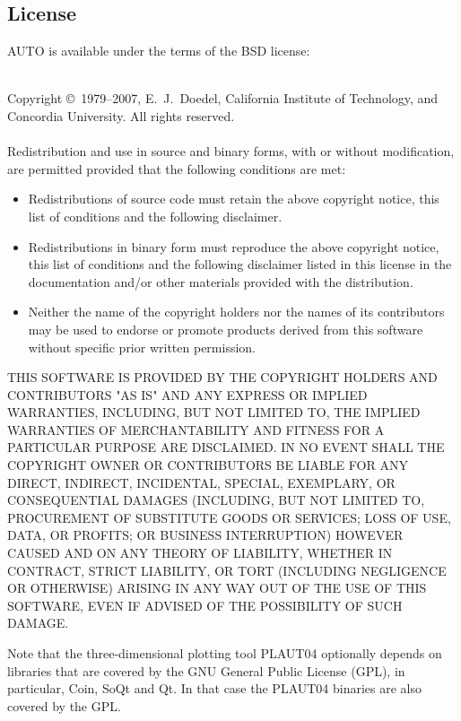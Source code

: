 \documentclass[12pt]{report}
\begin{document}
\subsection*{License}
{\cal AUTO} is available under the terms of the BSD license:\\
\begin{footnotesize}
~\\
Copyright \copyright~1979--2007, E.~J.~Doedel, California Institute of
Technology, and Concordia University.  All rights reserved.\\
~\\
Redistribution and use in source and binary forms, with or without
modification, are permitted provided that the following conditions are
met:
\begin{itemize}
\item Redistributions of source code must retain the above copyright
  notice, this list of conditions and the following disclaimer. 
  
\item Redistributions in binary form must reproduce the above copyright
  notice, this list of conditions and the following disclaimer listed
  in this license in the documentation and/or other materials
  provided with the distribution.
  
\item Neither the name of the copyright holders nor the names of its
  contributors may be used to endorse or promote products derived from
  this software without specific prior written permission.
\end{itemize}
THIS SOFTWARE IS PROVIDED BY THE COPYRIGHT HOLDERS AND CONTRIBUTORS
"AS IS" AND ANY EXPRESS OR IMPLIED WARRANTIES, INCLUDING, BUT NOT  
LIMITED TO, THE IMPLIED WARRANTIES OF MERCHANTABILITY AND FITNESS FOR
A PARTICULAR PURPOSE ARE DISCLAIMED. IN NO EVENT SHALL THE COPYRIGHT 
OWNER OR CONTRIBUTORS BE LIABLE FOR ANY DIRECT, INDIRECT, INCIDENTAL,
SPECIAL, EXEMPLARY, OR CONSEQUENTIAL DAMAGES (INCLUDING, BUT NOT
LIMITED TO, PROCUREMENT OF SUBSTITUTE GOODS OR SERVICES; LOSS OF USE,
DATA, OR PROFITS; OR BUSINESS INTERRUPTION) HOWEVER CAUSED AND ON ANY
THEORY OF LIABILITY, WHETHER IN CONTRACT, STRICT LIABILITY, OR TORT  
(INCLUDING NEGLIGENCE OR OTHERWISE) ARISING IN ANY WAY OUT OF THE USE
OF THIS SOFTWARE, EVEN IF ADVISED OF THE POSSIBILITY OF SUCH DAMAGE. 
\end{footnotesize}

Note that the three-dimensional plotting tool {\cal PLAUT04} optionally
depends on libraries that are covered by the GNU General Public
License (GPL), in particular, Coin, SoQt and Qt. In that case the
{\cal PLAUT04} binaries are also covered by the GPL.
\end{document}
